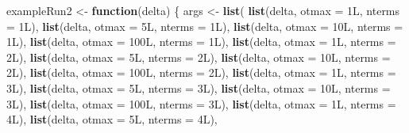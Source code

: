 \documentclass[
  12pt,
]{article}
\newenvironment{Shaded}{\begin{snugshade}}{\end{snugshade}}
\newcommand{\AttributeTok}[1]{\textcolor[rgb]{0.13,0.29,0.53}{#1}}
\newcommand{\ControlFlowTok}[1]{\textcolor[rgb]{0.13,0.29,0.53}{\textbf{#1}}}
\newcommand{\DataTypeTok}[1]{\textcolor[rgb]{0.13,0.29,0.53}{#1}}
\newcommand{\DecValTok}[1]{\textcolor[rgb]{0.00,0.00,0.81}{#1}}
\newcommand{\FunctionTok}[1]{\textcolor[rgb]{0.13,0.29,0.53}{\textbf{#1}}}
\newcommand{\NormalTok}[1]{#1}
\newcommand{\OtherTok}[1]{\textcolor[rgb]{0.56,0.35,0.01}{#1}}
\begin{document}
\begin{Shaded}
\begin{Highlighting}[]
\NormalTok{exampleRun2 }\OtherTok{\textless{}{-}} \ControlFlowTok{function}\NormalTok{(delta) \{}
\NormalTok{  args }\OtherTok{\textless{}{-}} \FunctionTok{list}\NormalTok{(}
    \FunctionTok{list}\NormalTok{(delta, }\AttributeTok{otmax =} \DecValTok{1}\DataTypeTok{L}\NormalTok{, }\AttributeTok{nterms =} \DecValTok{1}\DataTypeTok{L}\NormalTok{),}
    \FunctionTok{list}\NormalTok{(delta, }\AttributeTok{otmax =} \DecValTok{5}\DataTypeTok{L}\NormalTok{, }\AttributeTok{nterms =} \DecValTok{1}\DataTypeTok{L}\NormalTok{),}
    \FunctionTok{list}\NormalTok{(delta, }\AttributeTok{otmax =} \DecValTok{10}\DataTypeTok{L}\NormalTok{, }\AttributeTok{nterms =} \DecValTok{1}\DataTypeTok{L}\NormalTok{),}
    \FunctionTok{list}\NormalTok{(delta, }\AttributeTok{otmax =} \DecValTok{100}\DataTypeTok{L}\NormalTok{, }\AttributeTok{nterms =} \DecValTok{1}\DataTypeTok{L}\NormalTok{),}
    \FunctionTok{list}\NormalTok{(delta, }\AttributeTok{otmax =} \DecValTok{1}\DataTypeTok{L}\NormalTok{, }\AttributeTok{nterms =} \DecValTok{2}\DataTypeTok{L}\NormalTok{),}
    \FunctionTok{list}\NormalTok{(delta, }\AttributeTok{otmax =} \DecValTok{5}\DataTypeTok{L}\NormalTok{, }\AttributeTok{nterms =} \DecValTok{2}\DataTypeTok{L}\NormalTok{),}
    \FunctionTok{list}\NormalTok{(delta, }\AttributeTok{otmax =} \DecValTok{10}\DataTypeTok{L}\NormalTok{, }\AttributeTok{nterms =} \DecValTok{2}\DataTypeTok{L}\NormalTok{),}
    \FunctionTok{list}\NormalTok{(delta, }\AttributeTok{otmax =} \DecValTok{100}\DataTypeTok{L}\NormalTok{, }\AttributeTok{nterms =} \DecValTok{2}\DataTypeTok{L}\NormalTok{),}
    \FunctionTok{list}\NormalTok{(delta, }\AttributeTok{otmax =} \DecValTok{1}\DataTypeTok{L}\NormalTok{, }\AttributeTok{nterms =} \DecValTok{3}\DataTypeTok{L}\NormalTok{),}
    \FunctionTok{list}\NormalTok{(delta, }\AttributeTok{otmax =} \DecValTok{5}\DataTypeTok{L}\NormalTok{, }\AttributeTok{nterms =} \DecValTok{3}\DataTypeTok{L}\NormalTok{),}
    \FunctionTok{list}\NormalTok{(delta, }\AttributeTok{otmax =} \DecValTok{10}\DataTypeTok{L}\NormalTok{, }\AttributeTok{nterms =} \DecValTok{3}\DataTypeTok{L}\NormalTok{),}
    \FunctionTok{list}\NormalTok{(delta, }\AttributeTok{otmax =} \DecValTok{100}\DataTypeTok{L}\NormalTok{, }\AttributeTok{nterms =} \DecValTok{3}\DataTypeTok{L}\NormalTok{),}
    \FunctionTok{list}\NormalTok{(delta, }\AttributeTok{otmax =} \DecValTok{1}\DataTypeTok{L}\NormalTok{, }\AttributeTok{nterms =} \DecValTok{4}\DataTypeTok{L}\NormalTok{),}
    \FunctionTok{list}\NormalTok{(delta, }\AttributeTok{otmax =} \DecValTok{5}\DataTypeTok{L}\NormalTok{, }\AttributeTok{nterms =} \DecValTok{4}\DataTypeTok{L}\NormalTok{),}

\end{Highlighting}
\end{Shaded}
\end{document}
